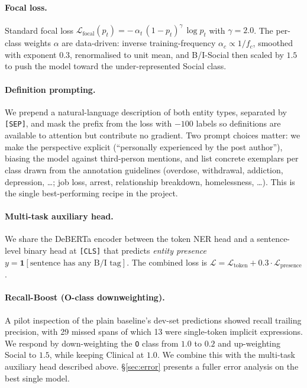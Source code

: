 \documentclass[11pt]{article}
\begin{document}
\paragraph{Focal loss.} Standard focal loss \citep{lin2017focal}
$\mathcal{L}_{\text{focal}}(p_t) = -\,\alpha_t\,(1 - p_t)^{\gamma}\,\log p_t$
with $\gamma = 2.0$. The per-class weights $\alpha$ are data-driven:
inverse training-frequency $\alpha_c \propto 1/f_c$, smoothed with
exponent $0.3$, renormalised to unit mean, and B/I-Social then scaled by
$1.5$ to push the model toward the under-represented Social class.

\paragraph{Definition prompting.} We prepend a natural-language
description of both entity types, separated by \texttt{[SEP]}, and mask
the prefix from the loss with $-100$ labels so definitions are available
to attention but contribute no gradient. Two prompt choices matter: we
make the perspective explicit (``personally experienced by the post
author''), biasing the model against third-person mentions, and list
concrete exemplars per class drawn from the annotation guidelines
(overdose, withdrawal, addiction, depression, \ldots; job loss, arrest,
relationship breakdown, homelessness, \ldots). This is the single
best-performing recipe in the project.

\paragraph{Multi-task auxiliary head.} We share the DeBERTa encoder
between the token NER head and a sentence-level binary head at
\texttt{[CLS]} that predicts \emph{entity presence}
$y = \mathbf{1}[\text{sentence has any B/I tag}]$. The combined loss is
$\mathcal{L} = \mathcal{L}_{\text{token}} +
0.3\cdot\mathcal{L}_{\text{presence}}$.

\paragraph{Recall-Boost (O-class downweighting).} A pilot inspection of
the plain baseline's dev-set predictions showed recall trailing
precision, with 29 missed spans of which 13 were single-token implicit
expressions. We respond by down-weighting the \texttt{O} class from
$1.0$ to $0.2$ and up-weighting Social to $1.5$, while keeping Clinical
at $1.0$. We combine this with the multi-task auxiliary head described
above. \S\ref{sec:error} presents a fuller error analysis on the best
single model.
\end{document}
